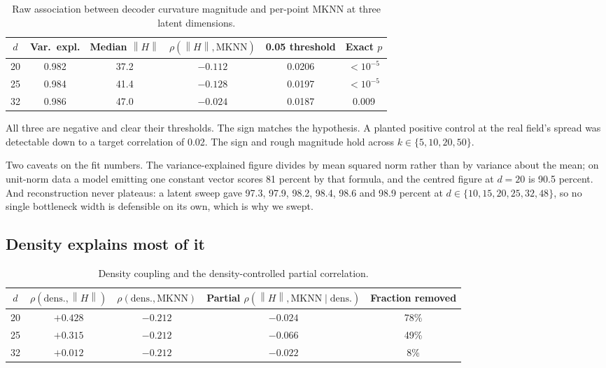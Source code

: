 \documentclass[11pt,a4paper]{article}
\newcommand{\norm}[1]{\left\lVert #1 \right\rVert}
\begin{document}
\begin{table}[h]
\centering
\footnotesize
\begin{tabular}{cccccc}
\toprule
$d$ & Var.\ expl. & Median $\norm{H}$ & $\rho(\norm{H}, \mathrm{MKNN})$ & 0.05 threshold & Exact $p$ \\
\midrule
20 & 0.982 & 37.2 & $-0.112$ & 0.0206 & $< 10^{-5}$ \\
25 & 0.984 & 41.4 & $-0.128$ & 0.0197 & $< 10^{-5}$ \\
32 & 0.986 & 47.0 & $-0.024$ & 0.0187 & 0.009 \\
\bottomrule
\end{tabular}
\caption{Raw association between decoder curvature magnitude and per-point MKNN at three latent dimensions.}
\label{tab:raw}
\end{table}

All three are negative and clear their thresholds. The sign matches the hypothesis. A planted positive control at the real field's spread was detectable down to a target correlation of 0.02. The sign and rough magnitude hold across $k \in \{5, 10, 20, 50\}$.

Two caveats on the fit numbers. The variance-explained figure divides by mean squared norm rather than by variance about the mean; on unit-norm data a model emitting one constant vector scores 81 percent by that formula, and the centred figure at $d = 20$ is 90.5 percent. And reconstruction never plateaus: a latent sweep gave 97.3, 97.9, 98.2, 98.4, 98.6 and 98.9 percent at $d \in \{10, 15, 20, 25, 32, 48\}$, so no single bottleneck width is defensible on its own, which is why we swept.

\subsection{Density explains most of it}

\begin{table}[h]
\centering
\small
\begin{tabular}{ccccc}
\toprule
$d$ & $\rho(\text{dens.}, \norm{H})$ & $\rho(\text{dens.}, \mathrm{MKNN})$ & Partial $\rho(\norm{H}, \mathrm{MKNN} \mid \text{dens.})$ & Fraction removed \\
\midrule
20 & $+0.428$ & $-0.212$ & $-0.024$ & 78\% \\
25 & $+0.315$ & $-0.212$ & $-0.066$ & 49\% \\
32 & $+0.012$ & $-0.212$ & $-0.022$ & 8\% \\
\bottomrule
\end{tabular}
\caption{Density coupling and the density-controlled partial correlation.}
\label{tab:density}
\end{table}
\end{document}
